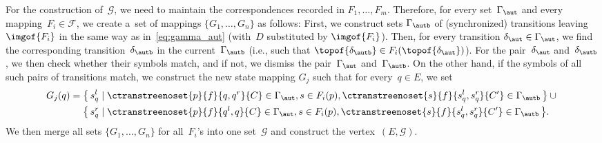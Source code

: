 For the construction of~$\mathcal{G}$, we need to maintain the correspondences
recorded in $F_1,\ldots,F_m$.
Therefore, for every set~$\Gamma_\aut$ and every mapping~$F_i \in \mathcal{F}$,
we create a~set of mappings $\{G_1, \ldots, G_n\}$ as follows:
First, we construct sets $\Gamma_\autb$ of (synchronized) transitions
leaving $\imgof{F_i}$ in the same way as in~\cref{eq:gamma_aut} (with~$D$
substituted by $\imgof{F_i}$).
Then, for every transition $\delta_\aut \in \Gamma_\aut$, we find the
corresponding transition~$\delta_\autb$ in the current~$\Gamma_\autb$ (i.e.,
such that $\topof{\delta_\autb} \in F_i(\topof{\delta_\aut})$).
For the pair~$\delta_\aut$ and~$\delta_\autb$, we then check whether their
symbols match, and if not, we dismiss the pair~$\Gamma_\aut$ and~$\Gamma_\autb$.
On the other hand, if the symbols of all such pairs of transitions match, we
construct the new state mapping $G_j$ such that for every~$q \in E$, we set
%
\begin{align*}
  G_j(q) = {} &\bigl\{\,s_q^l\mid \ctranstreenoset{p}{f}{q,q^r}{C}\in \Gamma_\aut,   s\in F_i(p), \ctranstreenoset{s}{f}{s^l_q,s^r_q}{C'} \in \Gamma_\autb\,\bigr\} \cup {} \\
  & \bigl\{\,s_q^r\mid \ctranstreenoset{p}{f}{q^l,q}{C}\in \Gamma_\aut, s\in F_i(p), \ctranstreenoset{s}{f}{s^l_q,s^r_q}{C'} \in \Gamma_\autb\,\bigr\}.
\end{align*}
%
We then merge all sets $\{G_1, \ldots, G_n\}$ for all~$F_i$'s into one
set~$\mathcal{G}$ and construct the vertex~$(E, \mathcal{G})$.

